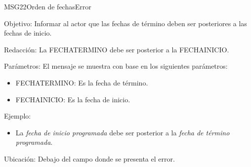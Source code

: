 \begin{mensaje}{MSG22}{Orden de fechas}{Error}
	\item [Objetivo:] Informar al actor que las fechas de término deben ser posteriores a las fechas de inicio.
	\item[Redacción:] La FECHATERMINO debe ser posterior a la FECHAINICIO.
	\item[Parámetros:] El mensaje se muestra con base en los siguientes parámetros:
	\begin{itemize}
		\item FECHATERMINO: Es la fecha de término.
		\item FECHAINICIO: Es la fecha de inicio.
	\end{itemize}
\item[Ejemplo:] \begin{itemize}
	\item La { \em fecha de inicio programada} debe ser posterior a la {\em fecha de término programada}.
\end{itemize}
	\item [Ubicación:] Debajo del campo donde se presenta el error.
\end{mensaje}